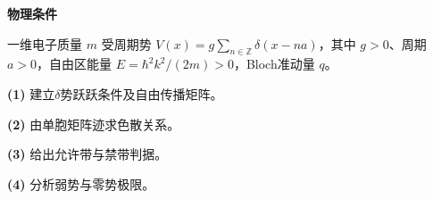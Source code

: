 \textbf{物理条件}\par 一维电子质量 \(m\) 受周期势 \(V(x)=g\sum_{n\in\mathbb Z}\delta(x-na)\)，其中 \(g>0\)、周期 \(a>0\)，自由区能量 \(E=\hbar^2k^2/(2m)>0\)，Bloch准动量 \(q\)。
\par\noindent\textbf{(1)} 建立\(\delta\)势跃跃条件及自由传播矩阵。
\par\noindent\textbf{(2)} 由单胞矩阵迹求色散关系。
\par\noindent\textbf{(3)} 给出允许带与禁带判据。
\par\noindent\textbf{(4)} 分析弱势与零势极限。
